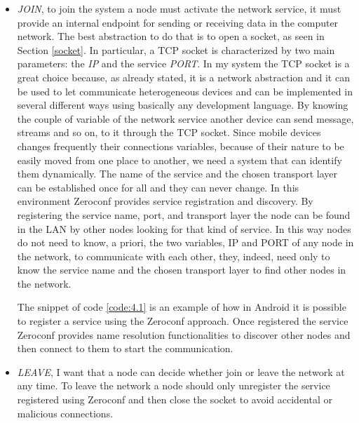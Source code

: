 \begin{itemize}
	\item \textit{JOIN}, to join the system a node must activate the network service, it must provide an internal endpoint for sending or receiving data in the computer network. The best abstraction to do that is to open a socket, as seen in Section \ref{socket}. In particular, a TCP socket is characterized by two main parameters: the \textit{IP} and the service \textit{PORT}. In my system the TCP socket is a great choice because, as already stated, it is a network abstraction and it can be used to let communicate heterogeneous devices and can be implemented in several different ways using basically any development language. By knowing the couple of variable of the network service another device can send message, streams and so on, to it through the TCP socket.  Since mobile devices changes frequently their connections variables, because of their nature to be easily moved from one place to another, we need a system that can identify them dynamically. The name of the service and the chosen transport layer can be established once for all and they can never change. In this environment Zeroconf provides service registration and discovery. By registering the service name, port, and transport layer the node can be found in the LAN by other nodes looking for that kind of service. In this way nodes do not need to know, a priori, the two variables, IP and PORT of any node in the network, to communicate with each other, they, indeed, need only to know the service name and the chosen transport layer to find other nodes in the network.
	
	The snippet of code \ref{code:4.1} is an example of how in Android it is possible to register a service using the Zeroconf approach. Once registered the service Zeroconf provides name resolution functionalities to discover other nodes and then connect to them to start the communication.
	\item \textit{LEAVE}, I want that a node can decide whether join or leave the network at any time. To leave the network a node should only unregister the service registered using Zeroconf and then close the socket to avoid accidental or malicious connections.

\end{itemize}
